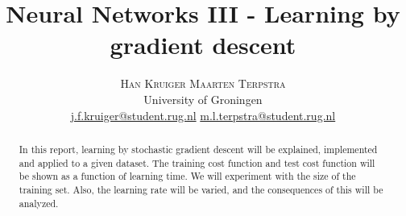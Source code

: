 \documentclass[twoside]{article}
\title{
   \vspace{-15mm}\fontsize{24pt}{10pt}\selectfont\textbf{Neural Networks III - Learning by gradient descent}
} %
\author{
   \large
   \hspace{6mm}\textsc{Han Kruiger} \hspace{12mm} \textsc{Maarten Terpstra}\\[2mm] %
   \normalsize University of Groningen \\ %
   \normalsize \href{mailto:j.f.kruiger@student.rug.nl}{j.f.kruiger@student.rug.nl} \hspace{5mm} \normalsize \href{mailto:m.l.terpstra@student.rug.nl}{m.l.terpstra@student.rug.nl} %
   \vspace{-5mm}
}
\date{}
\begin{document}
\maketitle %

\thispagestyle{fancy} %


\begin{abstract}
   \noindent In this report, learning by stochastic gradient descent will be explained, implemented and applied to a given dataset.
   The training cost function and test cost function will be shown as a function of learning time.
   We will experiment with the size of the training set.
   Also, the learning rate will be varied, and the consequences of this will be analyzed.
\end{abstract}

\end{document}
